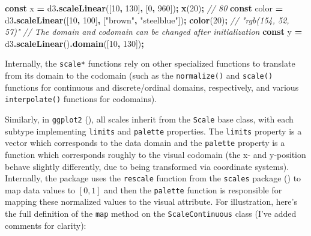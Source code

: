 \documentclass[
  openany]{book}
\newenvironment{Shaded}{\begin{snugshade}}{\end{snugshade}}
\newcommand{\CommentTok}[1]{\textcolor[rgb]{0.56,0.35,0.01}{\textit{#1}}}
\newcommand{\DecValTok}[1]{\textcolor[rgb]{0.00,0.00,0.81}{#1}}
\newcommand{\FunctionTok}[1]{\textcolor[rgb]{0.13,0.29,0.53}{\textbf{#1}}}
\newcommand{\KeywordTok}[1]{\textcolor[rgb]{0.13,0.29,0.53}{\textbf{#1}}}
\newcommand{\NormalTok}[1]{#1}
\newcommand{\OperatorTok}[1]{\textcolor[rgb]{0.81,0.36,0.00}{\textbf{#1}}}
\newcommand{\StringTok}[1]{\textcolor[rgb]{0.31,0.60,0.02}{#1}}
\theoremstyle{definition}
\theoremstyle{definition}
\theoremstyle{definition}
\theoremstyle{definition}
\theoremstyle{remark}
\begin{document}
\begin{Shaded}
\begin{Highlighting}[]
\KeywordTok{const}\NormalTok{ x }\OperatorTok{=}\NormalTok{ d3}\OperatorTok{.}\FunctionTok{scaleLinear}\NormalTok{([}\DecValTok{10}\OperatorTok{,} \DecValTok{130}\NormalTok{]}\OperatorTok{,}\NormalTok{ [}\DecValTok{0}\OperatorTok{,} \DecValTok{960}\NormalTok{])}\OperatorTok{;}
\FunctionTok{x}\NormalTok{(}\DecValTok{20}\NormalTok{)}\OperatorTok{;} \CommentTok{// 80}
\KeywordTok{const}\NormalTok{ color }\OperatorTok{=}\NormalTok{ d3}\OperatorTok{.}\FunctionTok{scaleLinear}\NormalTok{([}\DecValTok{10}\OperatorTok{,} \DecValTok{100}\NormalTok{]}\OperatorTok{,}\NormalTok{ [}\StringTok{"brown"}\OperatorTok{,} \StringTok{"steelblue"}\NormalTok{])}\OperatorTok{;}
\FunctionTok{color}\NormalTok{(}\DecValTok{20}\NormalTok{)}\OperatorTok{;} \CommentTok{// "rgb(154, 52, 57)"}
\CommentTok{// The domain and codomain can be changed after initialization}
\KeywordTok{const}\NormalTok{ y }\OperatorTok{=}\NormalTok{ d3}\OperatorTok{.}\FunctionTok{scaleLinear}\NormalTok{()}\OperatorTok{.}\FunctionTok{domain}\NormalTok{([}\DecValTok{10}\OperatorTok{,} \DecValTok{130}\NormalTok{])}\OperatorTok{;} 
\end{Highlighting}
\end{Shaded}

Internally, the \texttt{scale*} functions rely on other specialized functions to translate from its domain to the codomain (such as the \texttt{normalize()} and \texttt{scale()} functions for continuous and discrete/ordinal domains, respectively, and various \texttt{interpolate()} functions for codomains).

Similarly, in \texttt{ggplot2} (), all scales inherit from the \texttt{Scale} base class, with each subtype implementing \texttt{limits} and \texttt{palette} properties. The \texttt{limits} property is a vector which corresponds to the data domain and the \texttt{palette} property is a function which corresponds roughly to the visual codomain (the x- and y-position behave slightly differently, due to being transformed via coordinate systems). Internally, the package uses the \texttt{rescale} function from the \texttt{scales} package () to map data values to \([0, 1]\) and then the \texttt{palette} function is responsible for mapping these normalized values to the visual attribute. For illustration, here's the full definition of the \texttt{map} method on the \texttt{ScaleContinuous} class (I've added comments for clarity):
\end{document}
